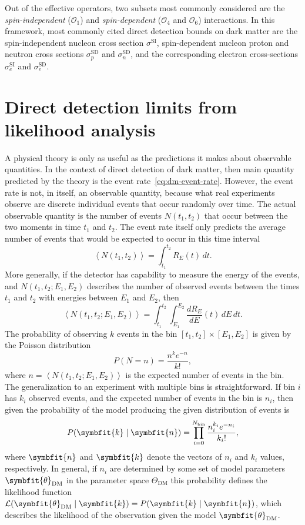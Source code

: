 \documentclass[b5paper, 10pt, twoside]{book}
\renewcommand{\vec}[1]{\symbfit{#1}}
\newcommand{\der}[2]{\frac{d#1}{d#2}}
\newcommand{\difd}{\,d}
\newcommand{\mean}[1]{\left\langle#1\right\rangle}
\begin{document}
Out of the effective operators, two subsets most commonly considered are the \emph{spin-independent} ($\mathcal{O_1}$) and \emph{spin-dependent} ($\mathcal{O}_4$ and $\mathcal{O}_6$) interactions. In this framework, most commonly cited direct detection bounds on dark matter are the spin-independent nucleon cross section $\sigma^\text{SI}$, spin-dependent nucleon proton and neutron cross sections $\sigma_p^\text{SD}$ and $\sigma_n^\text{SD}$, and the corresponding electron cross-sections $\sigma_e^\text{SI}$ and $\sigma_e^\text{SD}$.

\section{Direct detection limits from likelihood analysis}

A physical theory is only as useful as the predictions it makes about observable quantities. In the context of direct detection of dark matter, then main quantity predicted by the theory is the event rate~\eqref{eq:dm-event-rate}. However, the event rate is not, in itself, an observable quantity, because what real experiments observe are discrete individual events that occur randomly over time. The actual observable quantity is the number of events $N(t_1,t_2)$ that occur between the two moments in time $t_1$ and $t_2$. The event rate itself only predicts the average number of events that would be expected to occur in this time interval
\begin{equation}
    \mean{N(t_1,t_2)}=\int_{t_1}^{t_2}R_E(t)\difd t.
\end{equation}
More generally, if the detector has capability to measure the energy of the events, and $N(t_1,t_2;E_1,E_2)$ describes the number of observed events between the times $t_1$ and $t_2$ with energies between $E_1$ and $E_2$, then
\begin{equation}
    \mean{N(t_1,t_2;E_1,E_2)}=\int_{t_1}^{t_2}\int_{E_1}^{E_2}\der{R_E}{E}(t)\difd E\difd t.
\end{equation}
The probability of observing $k$ events in the bin $[t_1,t_2]\times[E_1,E_2]$ is given by the Poisson distribution
\begin{equation}
    P(N=n)=\frac{n^ke^{-n}}{k!},
\end{equation}
where $n=\mean{N(t_1,t_2;E_1,E_2)}$ is the expected number of events in the bin. The generalization to an experiment with multiple bins is straightforward. If bin $i$ has $k_i$ observed events, and the expected number of events in the bin is $n_i$, then given the probability of the model producing the given distribution of events is
\begin{equation}
    P(\vec{k}\mid \vec{n})=\prod_{i=0}^{N_\text{bin}}\frac{n_i^{k_i}e^{-n_i}}{{k_i}!},
\end{equation}
where $\vec{n}$ and $\vec{k}$ denote the vectors of $n_i$ and $k_i$ values, respectively. In general, if $n_i$ are determined by some set of model parameters $\vec{\theta}_\text{DM}$ in the parameter space $\Theta_\text{DM}$ this probability defines the likelihood function $\mathcal{L}(\vec{\theta}_\text{DM}\mid\vec{k})=P(\vec{k}\mid \vec{n})$, which describes the likelihood of the observation given the model $\vec{\theta}_\text{DM}$.
\end{document}
